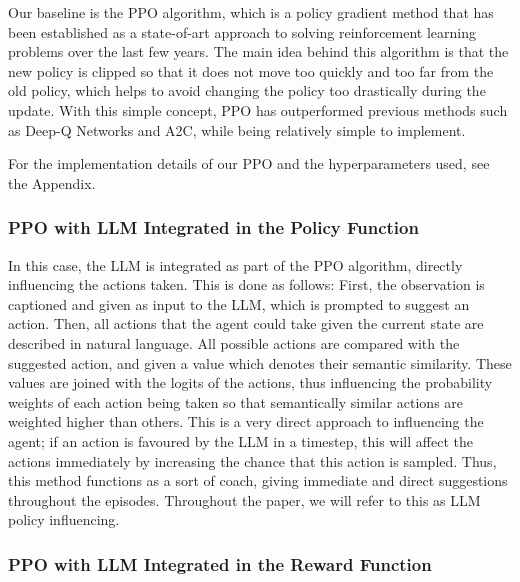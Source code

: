 \documentclass[conference]{IEEEtran}
\begin{document}
Our baseline is the PPO algorithm, which is a policy gradient method that has been established as a state-of-art approach to solving reinforcement learning problems over the last few years. The main idea behind this algorithm is that the new policy is clipped so that it does not move too quickly and too far from the old policy, which helps to avoid changing the policy too drastically during the update. With this simple concept, PPO has outperformed previous methods such as Deep-Q Networks and A2C, while being relatively simple to implement\cite{ppo}.

For the implementation details of our PPO and the hyperparameters used, see the Appendix.


\subsubsection{PPO with LLM Integrated in the Policy Function}

In this case, the LLM is integrated as part of the PPO algorithm, directly influencing the actions taken. This is done as follows: First, the observation is captioned and given as input to the LLM, which is prompted to suggest an action. Then, all actions that the agent could take given the current state are described in natural language. All possible actions are compared with the suggested action, and given a value which denotes their semantic similarity. These values are joined with the logits of the actions, thus influencing the probability weights of each action being taken so that semantically similar actions are weighted higher than others. This is a very direct approach to influencing the agent; if an action is favoured by the LLM in a timestep, this will affect the actions immediately by increasing the chance that this action is sampled. Thus, this method functions as a sort of coach, giving immediate and direct suggestions throughout the episodes. Throughout the paper, we will refer to this as LLM policy influencing.

\subsubsection{PPO with LLM Integrated in the Reward Function}
\end{document}
